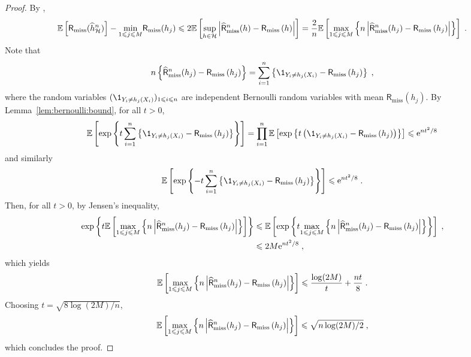 \begin{proof}
By ,
$$
\mathbb{E}\left[\mathsf{R}_{\mathrm{miss}}(\widehat h^n_{\mathcal{H}})\right]  - \underset{1\leqslant j \leqslant M}{\min}\mathsf{R}_{\mathrm{miss}}(h_j) \leqslant  2 \mathbb{E}\left[\underset{h\in\mathcal{H}}{\sup}\left|\widehat {\mathsf{R}}^n_{\mathrm{miss}}(h) - \mathsf{R}_{\mathrm{miss}}\left(h\right)\right|  \right]=\frac{2 }{n} \mathbb{E}\left[ \underset{1\leqslant j\leqslant M}{\max}\left\{n\left|\widehat {\mathsf{R}}^n_{\mathrm{miss}}(h_j) - \mathsf{R}_{\mathrm{miss}}\left(h_j\right)\right| \right\}\right]\;.
$$
Note that
\[
n\left\{\widehat {\mathsf{R}}^n_{\mathrm{miss}}(h_j) -  \mathsf{R}_{\mathrm{miss}}\left(h_j\right)\right\} = \sum_{i=1}^n \left\{\1_{Y_i \neq h_j(X_i)}  -  \mathsf{R}_{\mathrm{miss}}\left(h_j\right)\right\}\eqsp,
\]
where the random variables $(\1_{Y_i \neq h_j(X_i)})_{1\leqslant i \leqslant n}$ are independent Bernoulli random variables with mean $\mathsf{R}_{\mathrm{miss}}(h_j)$. By Lemma~\ref{lem:bernoulli:bound}, for all $t>0$,
\[
\bE\left[\mathrm{exp}\left\{t\sum_{i=1}^n \left\{\1_{Y_i \neq h_j(X_i)}  -  \mathsf{R}_{\mathrm{miss}}\left(h_j\right)\right\}\right\}\right] = \prod_{i=1}^n \bE\left[\mathrm{exp}\left\{t\left(\1_{Y_i \neq h_j(X_i)}  -  \mathsf{R}_{\mathrm{miss}}\left(h_j\right)\right)\right\}\right] \leqslant \rme^{nt^2/8}
\]
and similarly
\[
\bE\left[\mathrm{exp}\left\{-t\sum_{i=1}^n \left\{\1_{Y_i \neq h_j(X_i)}  -  \mathsf{R}_{\mathrm{miss}}\left(h_j\right)\right\}\right\}\right] \leqslant \rme^{nt^2/8}\eqsp.
\]
Then, for all $t>0$, by Jensen's inequality,
\begin{align*}
\mathrm{exp}\left\{t \mathbb{E}\left[ \underset{1\leqslant j\leqslant M}{\max}\left\{n\left|\widehat {\mathsf{R}}^n_{\mathrm{miss}}(h_j) - \mathsf{R}_{\mathrm{miss}}\left(h_j\right)\right| \right\}\right]\right\} &\leqslant \mathbb{E}\left[\mathrm{exp}\left\{t\underset{1\leqslant j\leqslant M}{\max}\left\{n\left|\widehat {\mathsf{R}}^n_{\mathrm{miss}}(h_j) - \mathsf{R}_{\mathrm{miss}}\left(h_j\right)\right|\right\}\right\}\right] \;,\\
&\leqslant 2M\mathrm{e}^{nt^2/8}\;,
\end{align*}
which yields
\[
 \mathbb{E}\left[ \underset{1\leqslant j\leqslant M}{\max}\left\{n\left|\widehat {\mathsf{R}}^n_{\mathrm{miss}}(h_j) - \mathsf{R}_{\mathrm{miss}}\left(h_j\right)\right| \right\}\right] \leqslant \frac{\log (2M)}{t} + \frac{nt}{8}\;.
\]
Choosing $t= \sqrt{8\log (2M)/n}$,
\[
 \mathbb{E}\left[ \underset{1\leqslant j\leqslant M}{\max}\left\{n\left|\widehat {\mathsf{R}}^n_{\mathrm{miss}}(h_j) - \mathsf{R}_{\mathrm{miss}}\left(h_j\right)\right|\right\}\right] \leqslant \sqrt{n\log(2M)/2}\;,
\]
which concludes the proof.
\end{proof}











